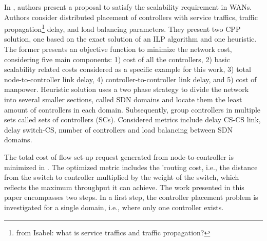\documentclass{IEEEtran}
\newcommand\fia[1]{{\color{red}\footnote{\color{red}from Isabel: #1}}} %
\newcommand\mia[1]{{\color{red}#1}}%
\newcommand\delia[1]{{\tiny{\color{red}#1}}} %
\begin{document}
In \cite{ZhWu17}, authors present a proposal to satisfy the scalability requirement in WANs.  Authors consider distributed placement of controllers with service traffics, traffic propagation\fia{what is service traffics and traffic propagation?}  delay, and load balancing parameters. They present two CPP solution, one \mia{based on the exact solution of an} ILP \delia{algorithm} and one heuristic. The former presents an objective function to minimize the network cost, considering five main components: 1) cost of all the controllers, 2) basic scalability related costs considered as a specific example for this work, 3) total node-to-controller link delay,  4) controller-to-controller link delay, and 5) cost of manpower. Heuristic solution uses a two phase strategy to divide the network into several smaller sections, called SDN domains and locate them the least amount of controllers in each domain. Subsequently, group controllers in multiple sets called sets of controllers (SCs). Considered metrics include delay CS-CS link, delay switch-CS, number of controllers and load balancing between SDN domains. 


 


The total cost of flow set-up request generated from node-to-controller is minimized in \cite{YaHo15}. The optimized metric includes the 'routing cost, i.e., the distance from the switch to controller multiplied by the weight of the switch, which reflects the maximum throughput it can achieve. The work presented in this paper encompasses two steps. In a first step, the controller placement problem is investigated for a single domain, i.e., where only one controller exists.%
\end{document}
